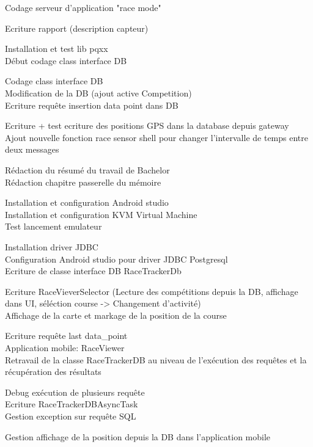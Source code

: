 \begin{multicols}{2}
Codage serveur d'application "race mode"

Ecriture rapport (description capteur)

Installation et test lib pqxx\\
Début codage class interface DB

Codage class interface DB\\
Modification de la DB (ajout active Competition)\\
Ecriture requête insertion data point dans DB

Ecriture + test ecriture des positions GPS dans la database depuis gateway\\
Ajout nouvelle fonction race sensor shell pour changer l’intervalle de temps entre deux messages

Rédaction du résumé du travail de Bachelor\\
Rédaction chapitre passerelle du mémoire

Installation et configuration Android studio\\
Installation et configuration KVM Virtual Machine\\
Test lancement emulateur

Installation driver JDBC\\
Configuration Android studio pour driver JDBC Postgresql\\
Ecriture de classe interface DB RaceTrackerDb

Ecriture RaceVieverSelector (Lecture des compétitions depuis la DB, affichage dans UI, séléction course -> Changement d’activité)\\
Affichage de la carte et markage de la position de la course

Ecriture requête last data\_point\\
Application mobile: RaceViewer\\
Retravail de la classe RaceTrackerDB au niveau de l’exécution des requêtes et la récupération des résultats

Debug exécution de plusieurs requête\\
Ecriture RaceTrackerDBAsyncTask\\
Gestion exception sur requête SQL

Gestion affichage de la position depuis la DB dans l’application mobile


\end{multicols}
